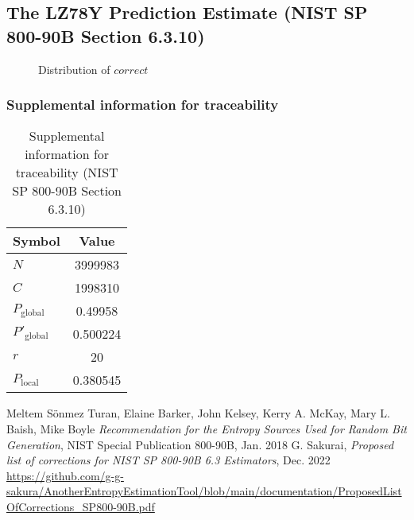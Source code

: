 \documentclass[a3paper,xelatex,english]{bxjsarticle}
\begin{document}
\subsection{The LZ78Y Prediction Estimate (NIST SP 800-90B Section 6.3.10)}
\begin{figure}[htbp]
\caption{Distribution of $correct$}
\end{figure}
\subsubsection{Supplemental information for traceability}
\renewcommand{\arraystretch}{1.8}
\begin{table}[h]
\caption{Supplemental information for traceability (NIST SP 800-90B Section 6.3.10)}
\begin{center}
\begin{tabular}{|l|c|}
\hline 
\rowcolor{anotherlightblue} %
Symbol				& Value \\ \hline 
$N$				& 3999983\\ \hline 
$C$				& 1998310\\ \hline 
$P_{\textrm{global}}$				&  0.49958\\ \hline 
$P'_{\textrm{global}}$			& 0.500224\\ \hline 
$r$				& 20\\ \hline 
$P_{\textrm{local}}$ 			& 0.380545\\ \hline
\end{tabular}
\end{center}
\end{table}
\renewcommand{\arraystretch}{1.4}
\begin{thebibliography}{99}
Meltem S\"{o}nmez Turan,
Elaine Barker,
John Kelsey,
Kerry A. McKay,
Mary L. Baish,
Mike Boyle
\textit{Recommendation for the Entropy Sources Used for Random Bit Generation},
NIST Special Publication 800-90B, Jan. 2018
G. Sakurai, \textit{Proposed list of corrections for NIST SP 800-90B 6.3 Estimators}, Dec. 2022
\url{https://github.com/g-g-sakura/AnotherEntropyEstimationTool/blob/main/documentation/ProposedListOfCorrections_SP800-90B.pdf}
\end{thebibliography}
\end{document}
